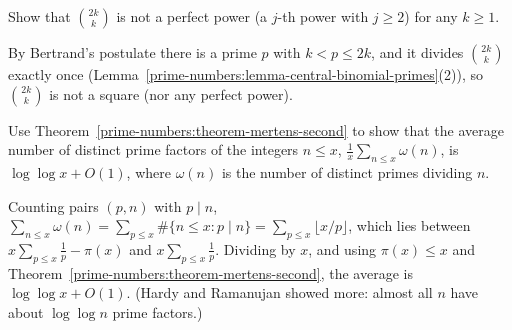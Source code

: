 \begin{exercise}\label{prime-numbers:exercise-factorial-power}
Show that $\binom{2k}{k}$ is not a perfect power (a $j$-th power with $j \geq 2$) for any $k \geq 1$.
\end{exercise}

\begin{solution}
By Bertrand's postulate there is a prime $p$ with $k < p \leq 2k$, and it divides $\binom{2k}{k}$ exactly once (Lemma~\ref{prime-numbers:lemma-central-binomial-primes}(2)), so $\binom{2k}{k}$ is not a square
(nor any perfect power).
\end{solution}

\begin{exercise}\label{prime-numbers:exercise-mertens-average}
Use Theorem~\ref{prime-numbers:theorem-mertens-second} to show that the average number of distinct prime factors of the integers $n \leq x$, $\frac{1}{x}\sum_{n \leq x}\omega(n)$, is $\log\log x + O(1)$, where $\omega(n)$ is the number of distinct primes dividing $n$.
\end{exercise}

\begin{solution}
Counting pairs $(p, n)$ with $p \mid n$, $\sum_{n \leq x}\omega(n) = \sum_{p \leq x}\#\{n \leq x : p \mid n\} = \sum_{p \leq x}\lfloor x/p\rfloor$, which lies between
$x\sum_{p \leq x}\frac1p - \pi(x)$ and $x\sum_{p \leq x}\frac1p$. Dividing by $x$, and using $\pi(x) \leq x$ and Theorem~\ref{prime-numbers:theorem-mertens-second}, the average is
$\log\log x + O(1)$. (Hardy and Ramanujan showed more: almost all $n$ have about $\log\log n$ prime factors.)
\end{solution}
